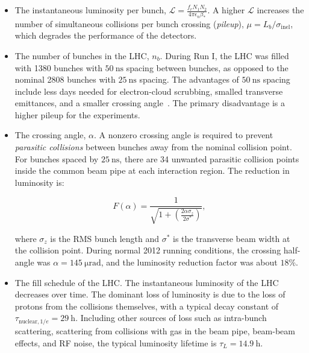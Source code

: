 \begin{itemize}
	\item The instantaneous luminosity per bunch, $\mathcal{L}=\frac{f_r N_1 N_2}{4\pi\epsilon_n \beta_{*}}$. A higher $\mathcal{L}$ increases the number of simultaneous collisions per bunch crossing (\emph{pileup}), $\mu=L_b/\sigma_{\mathrm{inel}}$, which degrades the performance of the detectors. 

	\item The number of bunches in the LHC, $n_b$. During Run I, the LHC was filled with 1380 bunches with $\SI{50}{\nano\second}$ spacing between bunches, as opposed to the nominal 2808 bunches with $\SI{25}{\nano\second}$ spacing. The advantages of $\SI{50}{\nano\second}$ spacing include less days needed for electron-cloud scrubbing, smalled transverse emittances, and a smaller crossing angle~\cite{Papotti:2014vb}. The primary disadvantage is a higher pileup for the experiments. 

	\item The crossing angle, $\alpha$. A nonzero crossing angle is required to prevent \emph{parasitic collisions} between bunches away from the nominal collision point. For bunches spaced by $\SI{25}{\nano\second}$, there are 34 unwanted parasitic collision points inside the common beam pipe at each interaction region. The reduction in luminosity is:

	\begin{equation}
		F(\alpha)=\frac{1}{\sqrt{1+\left(\frac{2\alpha \sigma_z}{2\sigma^*}\right)}},
	\end{equation}
	
	where $\sigma_z$ is the RMS bunch length and $\sigma^{*}$ is the transverse beam width at the collision point. During normal 2012 running conditions, the crossing half-angle was $\alpha=\SI{145}{\micro\radian}$, and the luminosity reduction factor was about $18\%$. 

	\item The fill schedule of the LHC. The instantaneous luminosity of the LHC decreases over time. The dominant loss of luminosity is due to the loss of protons from the collisions themselves, with a typical decay constant of $\tau_{\mathrm{nuclear},1/e}=\SI{29}{\hour}$. Including other sources of loss such as intra-bunch scattering, scattering from collisions with gas in the beam pipe, beam-beam effects, and RF noise, the typical luminosity lifetime is $\tau_L=\SI{14.9}{\hour}$. 


\end{itemize}
